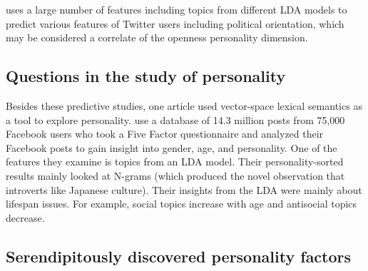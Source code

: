  uses a large number of features including topics
from different LDA models to predict various features of Twitter users including
political orientation, which may be considered a correlate of the openness
personality dimension.

\subsection{Questions in the study of personality}

Besides these predictive studies, one article used vector-space lexical 
semantics as a tool to explore personality. \citep{Schwartz2013a} use a 
database of 14.3 million posts from 75,000 
Facebook users who took a Five Factor questionnaire and analyzed their Facebook 
posts to gain insight into gender, age, and personality. One of the features 
they examine is topics from an LDA model. Their personality-sorted results
mainly looked at N-grams (which produced the novel observation that introverts
like Japanese culture). Their insights from the LDA were mainly about lifespan
issues. For example, social
topics increase with age and antisocial topics decrease.

\subsection{Serendipitously discovered personality factors}

